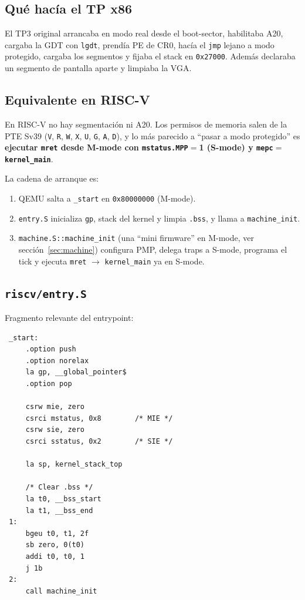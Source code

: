 \subsection{Qué hacía el TP x86}

El TP3 original arrancaba en modo real desde el boot-sector, habilitaba A20, cargaba la GDT con \texttt{lgdt}, prendía PE de CR0,
hacía el \texttt{jmp} lejano a modo protegido, cargaba los segmentos y fijaba el stack en \texttt{0x27000}. Además declaraba
un segmento de pantalla aparte y limpiaba la VGA.

\subsection{Equivalente en RISC-V}

En RISC-V no hay segmentación ni A20. Los permisos de memoria salen de la PTE Sv39 (\texttt{V}, \texttt{R}, \texttt{W},
\texttt{X}, \texttt{U}, \texttt{G}, \texttt{A}, \texttt{D}), y lo más parecido a ``pasar a modo protegido'' es
\textbf{ejecutar \texttt{mret} desde M-mode con \texttt{mstatus.MPP}$=$1 (S-mode) y
\texttt{mepc}$=$\texttt{kernel\_main}}.

La cadena de arranque es:

\begin{enumerate}
  \item QEMU salta a \texttt{\_start} en \texttt{0x80000000} (M-mode).
  \item \texttt{entry.S} inicializa \texttt{gp}, stack del kernel y limpia \texttt{.bss}, y llama a
  \texttt{machine\_init}.
  \item \texttt{machine.S::machine\_init} (una ``mini firmware'' en M-mode, ver sección~\ref{sec:machine}) configura
  PMP, delega traps a S-mode, programa el tick y ejecuta \texttt{mret} $\to$ \texttt{kernel\_main} ya en S-mode.
\end{enumerate}

\subsection{\texttt{riscv/entry.S}}

Fragmento relevante del entrypoint:

\begin{codesnippet}
\begin{verbatim}
 _start:
     .option push
     .option norelax
     la gp, __global_pointer$
     .option pop

     csrw mie, zero
     csrci mstatus, 0x8        /* MIE */
     csrw sie, zero
     csrci sstatus, 0x2        /* SIE */

     la sp, kernel_stack_top

     /* Clear .bss */
     la t0, __bss_start
     la t1, __bss_end
 1:
     bgeu t0, t1, 2f
     sb zero, 0(t0)
     addi t0, t0, 1
     j 1b
 2:
     call machine_init
\end{verbatim}
\end{codesnippet}

